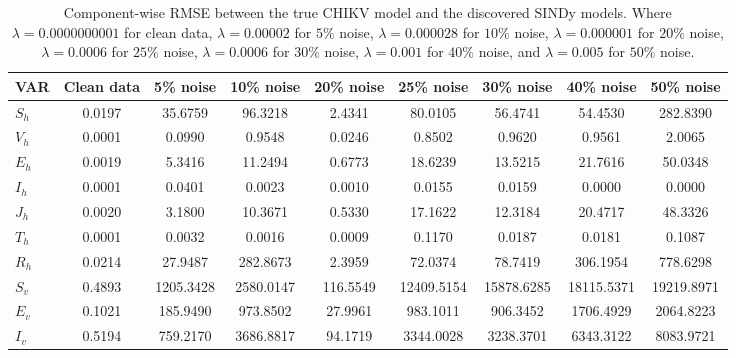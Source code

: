 \documentclass[9pt]{article}
\numberwithin{equation}{section}
\begin{document}
\begin{table}[ht]
    \centering
    \caption{Component-wise RMSE between the true CHIKV model and the discovered SINDy models. Where $\lambda=0.0000000001$ for clean data, $\lambda=0.00002$ for $5\%$ noise, $\lambda=0.000028$ for $10\%$ noise, $\lambda=0.000001$ for $20\%$ noise, $\lambda=0.0006$ for $25\%$ noise, $\lambda=0.0006$ for $30\%$ noise, $\lambda=0.001$ for $40\%$ noise, and $\lambda=0.005$ for $50\%$ noise.}
    \label{table4}
    \begin{tabular}{|l|c|c|c|c|c|c|c|c|}
        \hline
        \textbf{VAR} & \textbf{Clean data} & \textbf{5\% noise} & \textbf{10\% noise} & \textbf{20\% noise} & \textbf{25\% noise}& \textbf{30\% noise} & \textbf{40\% noise} & \textbf{50\% noise} \\
        \hline
        $S_h$ & 0.0197 & 35.6759 & 96.3218 & 2.4341 & 80.0105 & 56.4741 & 54.4530 & 282.8390 \\
        \hline
        $V_h$ & 0.0001 & 0.0990 & 0.9548 & 0.0246 & 0.8502 & 0.9620 & 0.9561 & 2.0065 \\
        \hline
        $E_h$ & 0.0019 & 5.3416 & 11.2494 & 0.6773 & 18.6239 & 13.5215 & 21.7616 & 50.0348 \\
        \hline
        $I_h$ & 0.0001 & 0.0401 & 0.0023 & 0.0010 & 0.0155 & 0.0159 & 0.0000 & 0.0000 \\
        \hline
        $J_h$ & 0.0020 & 3.1800 & 10.3671 & 0.5330 & 17.1622 & 12.3184 & 20.4717 & 48.3326 \\
        \hline
        $T_h$ & 0.0001 & 0.0032 & 0.0016 & 0.0009 & 0.1170 & 0.0187 & 0.0181 & 0.1087 \\
        \hline
        $R_h$ & 0.0214 & 27.9487 & 282.8673 & 2.3959 & 72.0374 & 78.7419 & 306.1954 & 778.6298 \\
        \hline
        $S_v$ & 0.4893 & 1205.3428 & 2580.0147 & 116.5549 & 12409.5154 & 15878.6285 & 18115.5371 & 19219.8971 \\
        \hline
        $E_v$ & 0.1021 & 185.9490 & 973.8502 & 27.9961 & 983.1011 & 906.3452 & 1706.4929 & 2064.8223 \\
        \hline
        $I_v$ &  0.5194 & 759.2170 & 3686.8817 & 94.1719 & 3344.0028 & 3238.3701 & 6343.3122 & 8083.9721 \\
        \hline
    \end{tabular}
\end{table}
\end{document}
